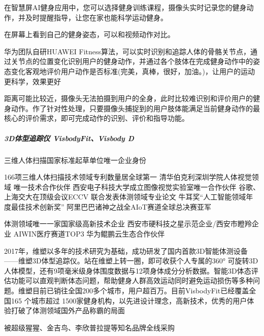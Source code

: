 \documentclass[letterpaper,11pt,english]{sphinxmanual}
\begin{document}
在智慧屏AI健身应用中，您可以选择健身训练课程，摄像头实时记录您的健身动作，并及时提醒指导，让您在家也能科学运动健身。

在屏幕上看到自己的健身姿态，可以和视频动作对比。

华为团队自研HUAWEI
Fitness算法，可以实时识别和追踪人体的骨骼关节点，通过关节点的位置变化识别用户的健身动作，并通过各个肢体在完成健身动作中的姿态变化客观地评价用户动作是否标准(完美，真棒，很好，加油。)，让用户的运动更科学，效果更好

距离可能比较近，摄像头无法拍摄到用户的全身，此时比较难识别和评价用户的健身动作。作了针对性处理，只要摄像头捕捉到的用户肢体能满足当前健身动作的最核心的评价需求，即可完成动作的识别、评价和指导功能。


\subparagraph{3D体型追踪仪 VisbodyFit、Visbody D}
\label{\detokenize{chapter_project/AI_fit:d-visbodyfitvisbody-d}}
三维人体扫描国家标准起草单位唯一企业身份
%
\begin{footnote}[687]\sphinxAtStartFootnote
{}
%
\end{footnote}
166项三维人体扫描技术领域专利数量居全球第一
清华\sphinxhyphen{}伯克利深圳学院人体视觉领域 唯一技术合作伙伴
西安电子科技大学成立图像视觉实验室唯一合作伙伴
谷歌、上海交大在顶级会议ECCV 联合发表体测领域专业论文
牛耳奖“人工智能领域年度最佳技术创新奖”
阿里巴巴诸神之战全AIoT赛道全球总决赛亚军%
\begin{footnote}[688]\sphinxAtStartFootnote
{}
%
\end{footnote}
体测领域唯一一家国家级高新技术企业
西安市硬科技之星示范企业/西安市瞪羚企业 AIWIN医疗赛道TOP3
华为鲲鹏云生态合作伙伴

2017年，维塑以多年的技术研究为基础，成功研发了国内首款3D智能体测设备——维塑3D体型追踪仪。站在维塑上转一圈，即可收获个人专属的360°
可旋转3D人体模型，还有9项毫米级身体围度数据与12项身体成分分析数据。智能3D体态评估功能可以直观判断体态问题，帮助健身人群高效运动同时避免运动损伤等多种问题。维塑目前已销往全国200多个城市，用户超百万。目前VisbodyFit已经覆盖全国165
个城市超过
1500家健身机构，以先进设计理念，高新技术，优秀的用户体验打破了体测领域国外产品称霸的局面
%
\begin{footnote}[689]\sphinxAtStartFootnote
{}
%
\end{footnote}
被超级猩猩、金吉鸟、李欣普拉提等知名品牌全线采购
%
\begin{footnote}[690]\sphinxAtStartFootnote
{}
%
\end{footnote}
\end{document}
